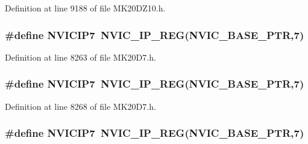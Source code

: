 Definition at line 9188 of file M\+K20\+D\+Z10.\+h.

\subsubsection[{\texorpdfstring{N\+V\+I\+C\+I\+P7}{NVICIP7}}]{\setlength{\rightskip}{0pt plus 5cm}\#define N\+V\+I\+C\+I\+P7~{\bf N\+V\+I\+C\+\_\+\+I\+P\+\_\+\+R\+EG}({\bf N\+V\+I\+C\+\_\+\+B\+A\+S\+E\+\_\+\+P\+TR},7)}\hypertarget{group___n_v_i_c___register___accessor___macros_gad98e6ae59d9f5926ce3fb5e2facf01fa}{}\label{group___n_v_i_c___register___accessor___macros_gad98e6ae59d9f5926ce3fb5e2facf01fa}


Definition at line 8263 of file M\+K20\+D7.\+h.

\subsubsection[{\texorpdfstring{N\+V\+I\+C\+I\+P7}{NVICIP7}}]{\setlength{\rightskip}{0pt plus 5cm}\#define N\+V\+I\+C\+I\+P7~{\bf N\+V\+I\+C\+\_\+\+I\+P\+\_\+\+R\+EG}({\bf N\+V\+I\+C\+\_\+\+B\+A\+S\+E\+\_\+\+P\+TR},7)}\hypertarget{group___n_v_i_c___register___accessor___macros_gad98e6ae59d9f5926ce3fb5e2facf01fa}{}\label{group___n_v_i_c___register___accessor___macros_gad98e6ae59d9f5926ce3fb5e2facf01fa}


Definition at line 8268 of file M\+K20\+D7.\+h.

\subsubsection[{\texorpdfstring{N\+V\+I\+C\+I\+P7}{NVICIP7}}]{\setlength{\rightskip}{0pt plus 5cm}\#define N\+V\+I\+C\+I\+P7~{\bf N\+V\+I\+C\+\_\+\+I\+P\+\_\+\+R\+EG}({\bf N\+V\+I\+C\+\_\+\+B\+A\+S\+E\+\_\+\+P\+TR},7)}\hypertarget{group___n_v_i_c___register___accessor___macros_gad98e6ae59d9f5926ce3fb5e2facf01fa}{}\label{group___n_v_i_c___register___accessor___macros_gad98e6ae59d9f5926ce3fb5e2facf01fa}


